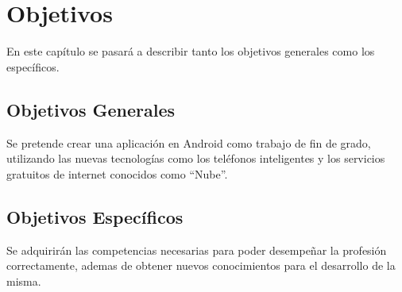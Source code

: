 %
%
%
%

\cleardoublepage
\chapter{Objetivos}
\label{chap:objetives}

	En este capítulo se pasará a describir tanto los objetivos generales como los específicos.
	
	\section{Objetivos Generales}
		Se pretende crear una aplicación en Android como trabajo de fin de grado, utilizando las nuevas tecnologías como los teléfonos inteligentes y los servicios gratuitos de internet conocidos como ``Nube''\cite{57:nube:online}.
	
	\section{Objetivos Específicos}
		Se adquirirán las competencias necesarias para poder desempeñar la profesión correctamente, ademas de obtener nuevos conocimientos para el desarrollo de la misma.
		